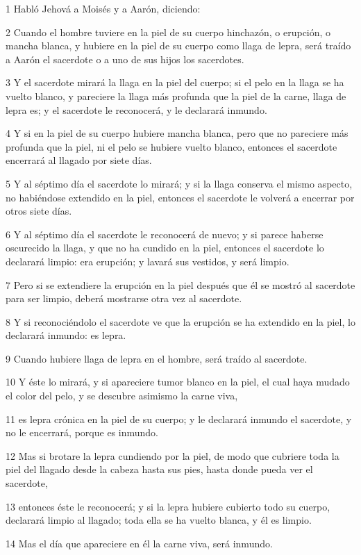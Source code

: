 \par 1 Habló Jehová a Moisés y a Aarón, diciendo:
\par 2 Cuando el hombre tuviere en la piel de su cuerpo hinchazón, o erupción, o mancha blanca, y hubiere en la piel de su cuerpo como llaga de lepra, será traído a Aarón el sacerdote o a uno de sus hijos los sacerdotes.
\par 3 Y el sacerdote mirará la llaga en la piel del cuerpo; si el pelo en la llaga se ha vuelto blanco, y pareciere la llaga más profunda que la piel de la carne, llaga de lepra es; y el sacerdote le reconocerá, y le declarará inmundo.
\par 4 Y si en la piel de su cuerpo hubiere mancha blanca, pero que no pareciere más profunda que la piel, ni el pelo se hubiere vuelto blanco, entonces el sacerdote encerrará al llagado por siete días.
\par 5 Y al séptimo día el sacerdote lo mirará; y si la llaga conserva el mismo aspecto, no habiéndose extendido en la piel, entonces el sacerdote le volverá a encerrar por otros siete días.
\par 6 Y al séptimo día el sacerdote le reconocerá de nuevo; y si parece haberse oscurecido la llaga, y que no ha cundido en la piel, entonces el sacerdote lo declarará limpio: era erupción; y lavará sus vestidos, y será limpio.
\par 7 Pero si se extendiere la erupción en la piel después que él se mostró al sacerdote para ser limpio, deberá mostrarse otra vez al sacerdote.
\par 8 Y si reconociéndolo el sacerdote ve que la erupción se ha extendido en la piel, lo declarará inmundo: es lepra.
\par 9 Cuando hubiere llaga de lepra en el hombre, será traído al sacerdote.
\par 10 Y éste lo mirará, y si apareciere tumor blanco en la piel, el cual haya mudado el color del pelo, y se descubre asimismo la carne viva,
\par 11 es lepra crónica en la piel de su cuerpo; y le declarará inmundo el sacerdote, y no le encerrará, porque es inmundo.
\par 12 Mas si brotare la lepra cundiendo por la piel, de modo que cubriere toda la piel del llagado desde la cabeza hasta sus pies, hasta donde pueda ver el sacerdote,
\par 13 entonces éste le reconocerá; y si la lepra hubiere cubierto todo su cuerpo, declarará limpio al llagado; toda ella se ha vuelto blanca, y él es limpio.
\par 14 Mas el día que apareciere en él la carne viva, será inmundo.
